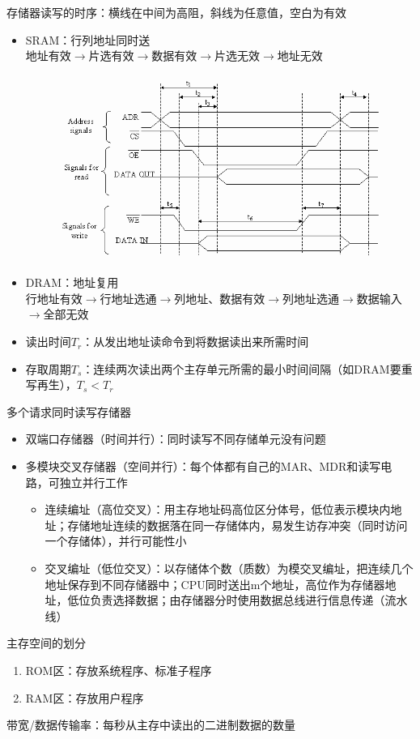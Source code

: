 存储器读写的时序：横线在中间为高阻，斜线为任意值，空白为有效
\begin{itemize}
	\item SRAM：行列地址同时送\\
	地址有效$\to$片选有效$\to$数据有效$\to$片选无效$\to$地址无效
	\begin{figure}[H]
	\centering
	\includegraphics[width=0.4\linewidth]{fig/sram_cycle.png}
	\end{figure}
	\item DRAM：地址复用\\
	行地址有效$\to$行地址选通$\to$列地址、数据有效$\to$列地址选通$\to$数据输入$\to$全部无效
\end{itemize}
\begin{itemize}
	\item 读出时间$T_r$：从发出地址读命令到将数据读出来所需时间
	\item 存取周期$T_s$：连续两次读出两个主存单元所需的最小时间间隔（如DRAM要重写再生），$T_s<T_r$
\end{itemize}
多个请求同时读写存储器
\begin{itemize}
	\item 双端口存储器（时间并行）：同时读写不同存储单元没有问题
	\item 多模块交叉存储器（空间并行）：每个体都有自己的MAR、MDR和读写电路，可独立并行工作
	\begin{itemize}
		\item 连续编址（高位交叉）：用主存地址码高位区分体号，低位表示模块内地址；存储地址连续的数据落在同一存储体内，易发生访存冲突（同时访问一个存储体），并行可能性小
		\item 交叉编址（低位交叉）：以存储体个数（质数）为模交叉编址，把连续几个地址保存到不同存储器中；CPU同时送出m个地址，高位作为存储器地址，低位负责选择数据；由存储器分时使用数据总线进行信息传递（流水线）
	\end{itemize}
\end{itemize}
主存空间的划分
\begin{enumerate}
	\item ROM区：存放系统程序、标准子程序
	\item RAM区：存放用户程序
\end{enumerate}
带宽/数据传输率：每秒从主存中读出的二进制数据的数量

